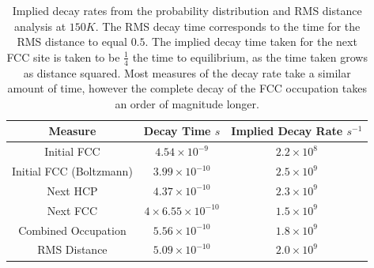 \begin{table}[htbp]
    \begin{center}
        \begin{tabular}{ *{3}{c} }
            \toprule
            Measure                 & Decay Time \(s\)                   & Implied Decay Rate \(s^{-1}\) \\
            \midrule
            Initial FCC             & \(4.54\times{}10^{-9}\)            & \(2.2\times{}10^{8}\)         \\
            Initial FCC (Boltzmann) & \(3.99\times{}10^{-10}\)           & \(2.5\times{}10^{9}\)         \\
            Next HCP                & \(4.37\times{}10^{-10}\)           & \(2.3\times{}10^{9}\)         \\
            Next FCC                & \(4\times{}6.55 \times{}10^{-10}\) & \(1.5\times{}10^{9}\)         \\
            Combined Occupation     & \(5.56\times{}10^{-10}\)           & \(1.8\times{}10^{9}\)         \\
            RMS Distance            & \(5.09\times{}10^{-10}\)           & \(2.0 \times 10^{9}\)         \\
            \bottomrule
        \end{tabular}
    \end{center}
    \caption{Implied decay rates
        from the probability
        distribution and RMS distance
        analysis at
        \(150K\).
        The RMS decay time corresponds
        to the time for the RMS distance
        to equal \(0.5\).
        The implied decay time taken for
        the next FCC site is taken to
        be \(\frac{1}{4}\) the time to
        equilibrium, as the time
        taken grows as distance
        squared.
        Most measures
        of the decay rate take a similar
        amount of time, however the
        complete decay of the FCC
        occupation takes an order of
        magnitude longer.
    }\label{tab:implied decay rates}
\end{table}

